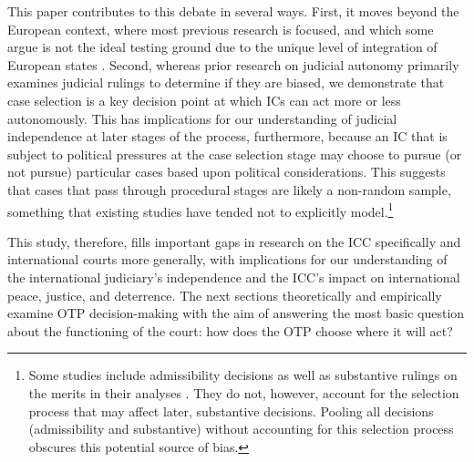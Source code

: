 This paper contributes to this debate in several ways. First, it moves beyond the European context, where most previous research is focused, and which some argue is not the ideal testing ground due to the unique level of integration of European states \citep{posner2005judicial}. Second, whereas prior research on judicial autonomy primarily examines judicial rulings to determine if they are biased, we demonstrate that case selection is a key decision point at which ICs can act more or less autonomously. This has implications for our understanding of judicial independence at later stages of the process, furthermore, because an IC that is subject to political pressures at the case selection stage may choose to pursue (or not pursue) particular cases based upon political considerations. This suggests that cases that pass through procedural stages are likely a non-random sample, something that existing studies have tended not to explicitly model.\footnote{Some studies include admissibility decisions as well as substantive rulings on the merits in their analyses \citep[e.g.,]{carrubba2008judicial, voeten2008impartiality}. They do not, however, account for the selection process that may affect later, substantive decisions. Pooling all decisions (admissibility and substantive) without accounting for this selection process obscures this potential source of bias.}  

This study, therefore, fills important gaps in research on the ICC specifically and international courts more generally, with implications for our understanding of the international judiciary's independence and the ICC's impact on international peace, justice, and deterrence. The next sections theoretically and empirically examine OTP decision-making with the aim of answering the most basic question about the functioning of the court: how does the OTP choose where it will act? 
